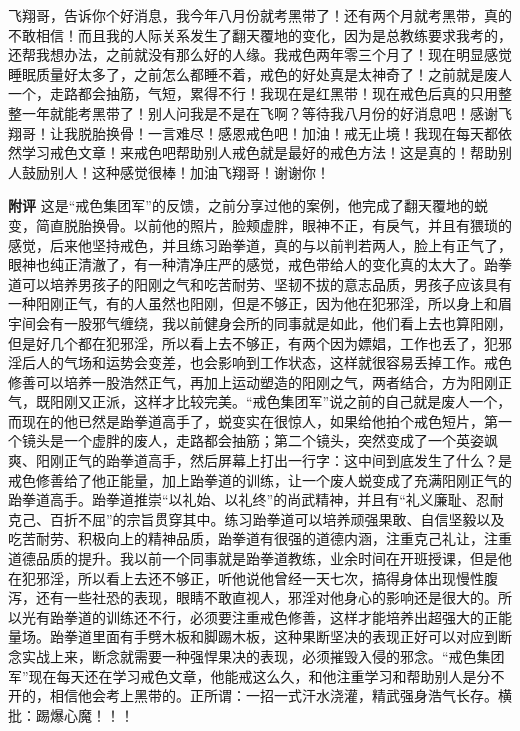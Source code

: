 \begin{case}
    飞翔哥，告诉你个好消息，我今年八月份就考黑带了！还有两个月就考黑带，真的不敢相信！而且我的人际关系发生了翻天覆地的变化，因为是总教练要求我考的，还帮我想办法，之前就没有那么好的人缘。我戒色两年零三个月了！现在明显感觉睡眠质量好太多了，之前怎么都睡不着，戒色的好处真是太神奇了！之前就是废人一个，走路都会抽筋，气短，累得不行！我现在是红黑带！现在戒色后真的只用整整一年就能考黑带了！别人问我是不是在飞啊？等待我八月份的好消息吧！感谢飞翔哥！让我脱胎换骨！一言难尽！感恩戒色吧！加油！戒无止境！我现在每天都依然学习戒色文章！来戒色吧帮助别人戒色就是最好的戒色方法！这是真的！帮助别人鼓励别人！这种感觉很棒！加油飞翔哥！谢谢你！

    \textbf{附评} 这是“戒色集团军”的反馈，之前分享过他的案例，他完成了翻天覆地的蜕变，简直脱胎换骨。以前他的照片，脸颊虚胖，眼神不正，有戾气，并且有猥琐的感觉，后来他坚持戒色，并且练习跆拳道，真的与以前判若两人，脸上有正气了，眼神也纯正清澈了，有一种清净庄严的感觉，戒色带给人的变化真的太大了。跆拳道可以培养男孩子的阳刚之气和吃苦耐劳、坚韧不拔的意志品质，男孩子应该具有一种阳刚正气，有的人虽然也阳刚，但是不够正，因为他在犯邪淫，所以身上和眉宇间会有一股邪气缠绕，我以前健身会所的同事就是如此，他们看上去也算阳刚，但是好几个都在犯邪淫，所以看上去不够正，有两个因为嫖娼，工作也丢了，犯邪淫后人的气场和运势会变差，也会影响到工作状态，这样就很容易丢掉工作。戒色修善可以培养一股浩然正气，再加上运动塑造的阳刚之气，两者结合，方为阳刚正气，既阳刚又正派，这样才比较完美。“戒色集团军”说之前的自己就是废人一个，而现在的他已然是跆拳道高手了，蜕变实在很惊人，如果给他拍个戒色短片，第一个镜头是一个虚胖的废人，走路都会抽筋；第二个镜头，突然变成了一个英姿飒爽、阳刚正气的跆拳道高手，然后屏幕上打出一行字：这中间到底发生了什么？是戒色修善给了他正能量，加上跆拳道的训练，让一个废人蜕变成了充满阳刚正气的跆拳道高手。跆拳道推崇“以礼始、以礼终”的尚武精神，并且有“礼义廉耻、忍耐克己、百折不屈”的宗旨贯穿其中。练习跆拳道可以培养顽强果敢、自信坚毅以及吃苦耐劳、积极向上的精神品质，跆拳道有很强的道德内涵，注重克己礼让，注重道德品质的提升。我以前一个同事就是跆拳道教练，业余时间在开班授课，但是他在犯邪淫，所以看上去还不够正，听他说他曾经一天七次，搞得身体出现慢性腹泻，还有一些社恐的表现，眼睛不敢直视人，邪淫对他身心的影响还是很大的。所以光有跆拳道的训练还不行，必须要注重戒色修善，这样才能培养出超强大的正能量场。跆拳道里面有手劈木板和脚踢木板，这种果断坚决的表现正好可以对应到断念实战上来，断念就需要一种强悍果决的表现，必须摧毁入侵的邪念。“戒色集团军”现在每天还在学习戒色文章，他能戒这么久，和他注重学习和帮助别人是分不开的，相信他会考上黑带的。正所谓：一招一式汗水浇灌，精武强身浩气长存。横批：踢爆心魔！！！
\end{case}

